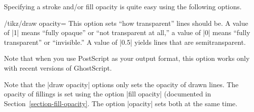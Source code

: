 Specifying a stroke and/or fill opacity is quite easy using the
following options.


\begin{key}{/tikz/draw opacity=}
  This option sets ``how transparent'' lines should be. A value of |1|
  means ``fully opaque'' or ``not transparent at all,'' a value of |0|
  means ``fully transparent'' or ``invisible.'' A value of |0.5|
  yields lines that are semitransparent.

  Note that when you use PostScript as your output format,
  this option works only with recent versions of GhostScript.
   
\begin{codeexample}[]
\end{codeexample}
\end{key}

Note that the |draw opacity| options only sets the opacity of drawn
lines. The opacity of fillings is set using the option
|fill opacity| (documented in Section~\ref{section-fill-opacity}. The
option |opacity| sets both at the same time. 

